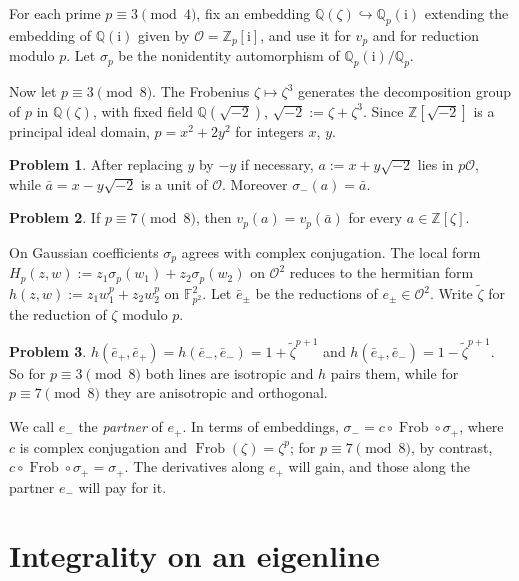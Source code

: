 \documentclass[reqno]{amsart}
\theoremstyle{definition}
\newtheorem{problem}{Problem}[section]
\theoremstyle{plain}
\newcommand{\Z}{\mathbb{Z}}
\newcommand{\Q}{\mathbb{Q}}
\newcommand{\F}{\mathbb{F}}
\newcommand{\ii}{\mathrm{i}}
\newcommand{\Oc}{\mathcal{O}}
\newcommand{\Frob}{\operatorname{Frob}}
\begin{document}
For each prime \(p \equiv 3 \pmod 4\), fix an embedding \(\Q(\zeta) \hookrightarrow \Q_p(\ii)\) extending the embedding of \(\Q(\ii)\) given by \(\Oc = \Z_p[\ii]\), and use it for \(v_p\) and for reduction modulo \(p\).  Let \(\sigma_p\) be the nonidentity automorphism of \(\Q_p(\ii)/\Q_p\).

Now let \(p \equiv 3 \pmod 8\).  The Frobenius \(\zeta \mapsto \zeta^3\) generates the decomposition group of \(p\) in \(\Q(\zeta)\), with fixed field \(\Q(\sqrt{-2})\), \(\sqrt{-2} := \zeta + \zeta^3\).  Since \(\Z[\sqrt{-2}]\) is a principal ideal domain, \(p = x^2 + 2y^2\) for integers \(x\), \(y\).

\begin{problem}\label{pr:a}
After replacing \(y\) by \(-y\) if necessary, \(a := x + y\sqrt{-2}\) lies in \(p\Oc\), while \(\bar a = x - y\sqrt{-2}\) is a unit of \(\Oc\).  Moreover \(\sigma_-(a) = \bar a\).
\end{problem}

\begin{problem}\label{pr:a-fails}
If \(p \equiv 7 \pmod 8\), then \(v_p(a) = v_p(\bar a)\) for every \(a \in \Z[\zeta]\).
\end{problem}

On Gaussian coefficients \(\sigma_p\) agrees with complex conjugation.  The local form \(H_p(z, w) := z_1 \sigma_p(w_1) + z_2 \sigma_p(w_2)\) on \(\Oc^2\) reduces to the hermitian form \(h(z, w) := z_1 w_1^p + z_2 w_2^p\) on \(\F_{p^2}^2\).  Let \(\bar e_\pm\) be the reductions of \(e_\pm \in \Oc^2\).  Write \(\widetilde{\zeta}\) for the reduction of \(\zeta\) modulo \(p\).

\begin{problem}\label{pr:isotropic}
\(h(\bar e_+, \bar e_+) = h(\bar e_-, \bar e_-) = 1 + \widetilde{\zeta}^{p+1}\) and \(h(\bar e_+, \bar e_-) = 1 - \widetilde{\zeta}^{p+1}\).  So for \(p \equiv 3 \pmod 8\) both lines are isotropic and \(h\) pairs them, while for \(p \equiv 7 \pmod 8\) they are anisotropic and orthogonal.
\end{problem}

We call \(e_-\) the \emph{partner} of \(e_+\).  In terms of embeddings, \(\sigma_- = c \circ \Frob \circ \sigma_+\), where \(c\) is complex conjugation and \(\Frob(\zeta) = \zeta^p\); for \(p \equiv 7 \pmod 8\), by contrast, \(c \circ \Frob \circ \sigma_+ = \sigma_+\).  The derivatives along \(e_+\) will gain, and those along the partner \(e_-\) will pay for it.

\section{Integrality on an eigenline}\label{sec:line}
\end{document}
